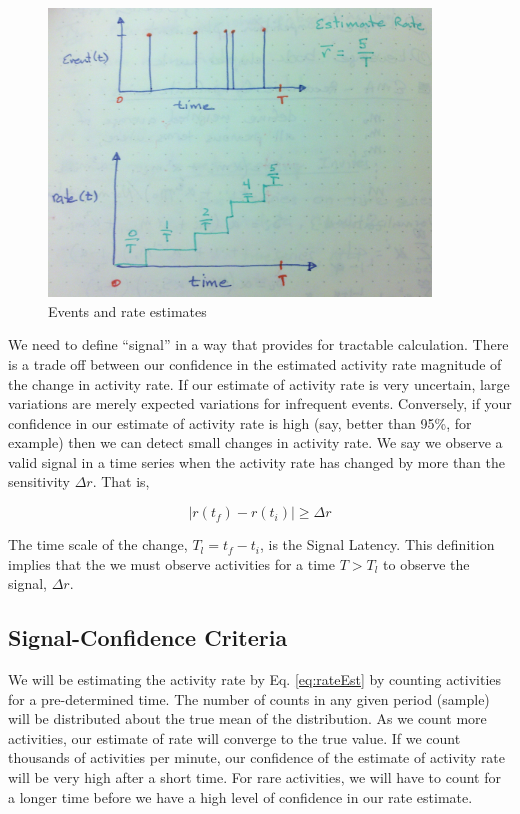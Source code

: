 \documentclass{article}
\begin{document}
%
\begin{figure}[h]
    \centering
    \includegraphics[width=4.0in]{./imgs/events.jpg}
    \caption{Events and rate estimates}
    \label{fig:events}
\end{figure}
%
%



We need to define ``signal'' in a way that provides for tractable calculation.  There is a trade off between our confidence in the estimated activity rate magnitude of the change in  activity rate.  If our estimate of activity rate is very uncertain, large variations are merely expected variations for infrequent events.  Conversely, if your confidence in our estimate of activity rate is high (say, better than 95\%, for example) then we can detect small changes in activity rate.  We say we observe a valid signal in a time series when the activity rate has changed by more than the sensitivity $\Delta r$.  That is,

\begin{equation}
    \label{eq:signal}
    | r(t_f) - r(t_i) | \geq \Delta r
\end{equation}

The time scale of the change, $T_l = t_f - t_i$, is the Signal Latency.  This definition implies that the we must observe activities for a time $T > T_l$ to observe the signal, $\Delta r$.

\subsection{Signal-Confidence Criteria} 

We will be estimating the activity rate by Eq. \ref{eq:rateEst} by counting activities for a pre-determined time.  The number of counts in any given period (sample) will be distributed about the true mean of the distribution. As we count more activities, our estimate of rate will converge to the true value.  If we count thousands of activities per minute, our confidence of the estimate of activity rate will be very high after a short time.  For rare activities, we will have to count for a longer time before we have a high level of confidence in our rate estimate.
\end{document}
